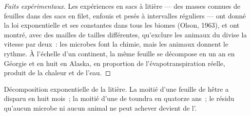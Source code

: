 \begin{proof}[Faits expérimentaux]
Les expériences en sacs à litière --- des masses connues de feuilles dans
des sacs en filet, enfouis et pesés à intervalles réguliers --- ont donné
la loi exponentielle et ses constantes dans tous les biomes (Olson, 1963),
et ont montré, avec des mailles de tailles différentes, qu'exclure les
animaux du  divise la vitesse par deux~: les microbes font la chimie,
mais les animaux donnent le rythme. À l'échelle d'un continent, la même
feuille se décompose en un an en Géorgie et en huit en Alaska, en
proportion de l'évapotranspiration réelle, produit de la chaleur et de
l'eau.
\end{proof}

\begin{omfigure}

{\small Décomposition exponentielle de la litière. La moitié d'une
feuille de hêtre a disparu en huit mois~; la moitié d'une  de
toundra en quatorze ans~; le résidu qu'aucun microbe ni aucun animal ne
peut achever devient de l'.}
\end{omfigure}

